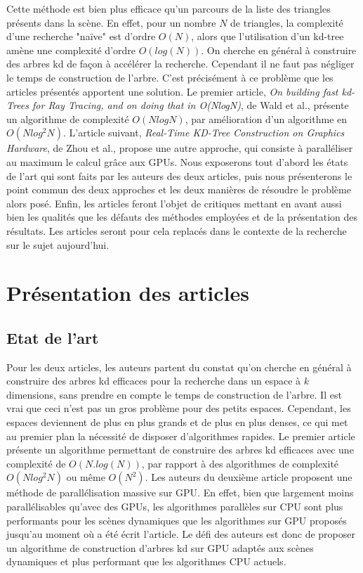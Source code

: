 \documentclass[a4paper]{article}
\begin{document}
Cette méthode est bien plus efficace qu'un parcours de la liste des triangles présents dans la scène. En effet, pour un nombre $N$ de triangles, la complexité d'une recherche "naïve" est d'ordre $O(N)$, alors que l'utilisation d'un kd-tree amène une complexité d'ordre $O(log(N))$.
On cherche en général à construire des arbres kd de façon à accélérer la recherche. Cependant il ne faut pas négliger le temps de construction de l'arbre. C'est précisément à ce problème que les articles présentés apportent une solution. Le premier article, \textit{On building fast kd-Trees for Ray Tracing, and on doing that in O(NlogN)}, de Wald et al., présente un algorithme de complexité $O(NlogN)$, par amélioration d'un algorithme en $O(Nlog^2N)$. L'article suivant, \textit{Real-Time KD-Tree Construction on Graphics Hardware}, de Zhou et al., propose une autre approche, qui consiste à paralléliser au maximum le calcul grâce aux GPUs.
Nous exposerons tout d'abord les états de l'art qui sont faits par les auteurs des deux articles, puis nous présenterons le point commun des deux approches et les deux manières de résoudre le problème alors posé. Enfin, les articles feront l'objet de critiques mettant en avant aussi bien les qualités que les défauts des méthodes employées et de la présentation des résultats. Les articles seront pour cela replacés dans le contexte de la recherche sur le sujet aujourd'hui.

\section{Présentation des articles}

\subsection{Etat de l'art}
Pour les deux articles, les auteurs partent du constat qu'on cherche en général à construire des arbres kd efficaces pour la recherche dans un espace à $k$ dimensions, sans prendre en compte le temps de construction de l'arbre. Il est vrai que ceci n'est pas un gros problème pour des petits espaces. Cependant, les espaces deviennent de plus en plus grands et de plus en plus denses, ce qui met au premier plan la nécessité de disposer d'algorithmes rapides.
Le premier article présente un algorithme permettant de construire des arbres kd efficaces avec une complexité de $O(N.log(N))$, par rapport à des algorithmes de complexité $O(Nlog^2N)$ ou même $O(N^2)$. Les auteurs du deuxième article proposent une méthode de parallélisation massive sur GPU. En effet, bien que largement moins parallélisables qu'avec des GPUs, les algorithmes parallèles sur CPU sont plus performants pour les scènes dynamiques que les algorithmes sur GPU proposés jusqu'au moment où a été écrit l'article. Le défi des auteurs est donc de proposer un algorithme de construction d'arbres kd sur GPU adaptés aux scènes dynamiques et plus performant que les algorithmes CPU actuels.
\end{document}

